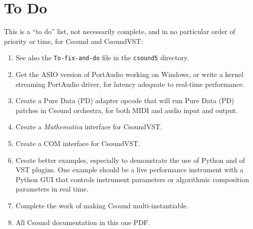 \documentclass[10pt,letterpaper,onecolumn]{ltxguide}
\begin{document}
\section{To Do}

This is a ``to do'' list, not necessarily complete, and in no particular order of priority or time, for Csound and CsoundVST:

\begin{enumerate}
\item See also the \texttt{To-fix-and-do} file in the \texttt{csound5} directory.
\item Get the ASIO version of PortAudio working on Windows, or write a kernel streaming PortAudio driver, for latency adequate to real-time performance.
\item Create a Pure Data (PD) adapter opcode that will run Pure Data (PD) patches in Csound orchestra, for both MIDI and audio input and output.
\item Create a \emph{Mathematica} interface for CsoundVST.
\item Create a COM interface for CsoundVST.
\item Create better examples, especially to demonstrate the use of Python and of VST plugins. One example should be a live performance instrument with a Python GUI that controls instrument parameters or algorithmic composition parameters in real time.
\item Complete the work of making Csound multi-instantiable.
\item All Csound documentation in this one PDF.
\end{enumerate}
\end{document}
